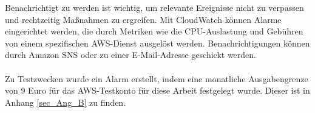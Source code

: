 Benachrichtigt zu werden ist wichtig, um relevante Ereignisse nicht zu verpassen und rechtzeitig Maßnahmen zu ergreifen. Mit CloudWatch können Alarme eingerichtet werden, die durch Metriken wie die CPU-Auslastung und Gebühren von einem spezifischen AWS-Dienst ausgelöst werden. Benachrichtigungen können durch Amazon SNS oder zu einer E-Mail-Adresse geschickt werden.
\\\\
Zu Testzwecken wurde ein Alarm erstellt, indem eine monatliche Ausgabengrenze von 9 Euro für das AWS-Testkonto für diese Arbeit festgelegt wurde. Dieser ist in Anhang \ref{sec_Ang_B} zu finden.
